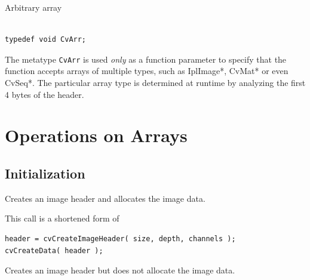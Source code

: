 \label{CvArr}

Arbitrary array

\begin{lstlisting}

typedef void CvArr;

\end{lstlisting}

The metatype \texttt{CvArr} is used \textit{only} as a function parameter to specify that the function accepts arrays of multiple types, such as IplImage*, CvMat* or even CvSeq*. The particular array type is determined at runtime by analyzing the first 4 bytes of the header.


\section{Operations on Arrays}

\subsection{Initialization}

\label{CreateImage}

Creates an image header and allocates the image data.


\begin{description}
\end{description}

This call is a shortened form of

\begin{lstlisting}
header = cvCreateImageHeader( size, depth, channels );
cvCreateData( header );
\end{lstlisting}


\label{CreateImageHeader}

Creates an image header but does not allocate the image data.


